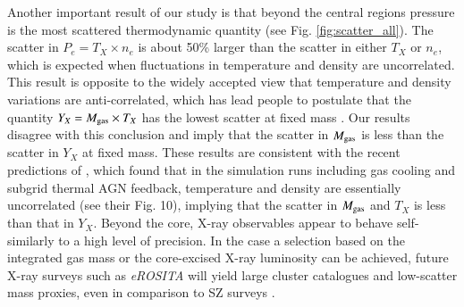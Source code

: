 \documentclass[traditabstract   ]{aa} %
\begin{document}
Another important result of our study is that beyond the central regions pressure is the most scattered thermodynamic quantity (see Fig. \ref{fig:scatter_all}). The scatter in $P_{e}=T_X\times n_e$ is about 50\% larger than the scatter in either $T_X$ or $n_e$, which is expected when fluctuations in temperature and density are uncorrelated. This result is opposite to the widely accepted view that temperature and density variations are anti-correlated, which has lead people to postulate that the quantity $Y_X=M_{\rm gas}\times T_{X}$ has the lowest scatter at fixed mass \citep{kravtsov06}. Our results disagree with this conclusion and imply that the scatter in $M_{\rm gas}$ is less than the scatter in $Y_X$ at fixed mass. These results are consistent with the recent predictions of \citet{truong18}, which found that in the simulation runs including gas cooling and subgrid thermal AGN feedback, temperature and density are essentially uncorrelated (see their Fig. 10), implying that the scatter in $M_{\rm gas}$ and $T_X$ is less than that in $Y_X$. Beyond the core, X-ray observables appear to behave self-similarly to a high level of precision. In the case a selection based on the integrated gas mass or the core-excised X-ray luminosity can be achieved, future X-ray surveys such as \emph{eROSITA} \citep{erosita} will yield large cluster catalogues and low-scatter mass proxies, even in comparison to SZ surveys \citep{mantz18}. 

\end{document}
